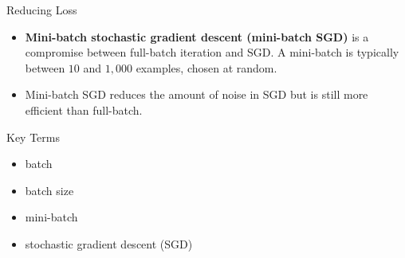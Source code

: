 \documentclass{beamer}
\begin{document}
\begin{frame}{Reducing Loss}
\begin{itemize}
    \item {\bf Mini-batch stochastic gradient descent (mini-batch SGD)} is a compromise between full-batch iteration and SGD. A mini-batch is typically between $10$ and $1,000$ examples, chosen at random. 
    
\medskip
\item Mini-batch SGD reduces the amount of noise in SGD but is still more efficient than full-batch.
\end{itemize}
\end{frame}

\begin{frame}{Key Terms}
\begin{itemize}
    \item batch
    \item batch size
    \item mini-batch
    \item stochastic gradient descent (SGD)
\end{itemize}

\end{frame}
\end{document}
